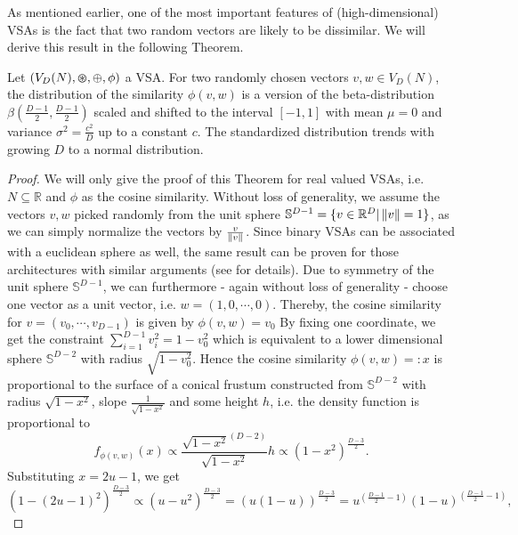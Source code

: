 As mentioned earlier, one of the most important features of (high-dimensional) \acp{VSA} is the fact that two random vectors are likely to be dissimilar.
We will derive this result in the following Theorem.
\begin{theorem}
	\label{theorem:VSA_cossim_distribution}
	Let $\left(V_{D}(N), \varoast, \oplus, \phi \right)$ a \acl{VSA}.
	For two randomly chosen vectors $v, w \in V_{D}(N)$, the distribution of the similarity $\phi\left(v,w\right)$ is a version of the beta-distribution $\beta\left(\frac{D-1}{2},\frac{D-1}{2}\right)$ scaled and shifted to the interval $\left[-1,1\right]$ with mean $\mu=0$ and variance $\sigma^2=\frac{c^2}{D}$ up to a constant $c$. The standardized distribution trends with growing $D$ to a normal distribution.
\end{theorem}
\begin{proof}
	We will only give the proof of this Theorem for real valued \acp{VSA}, i.e. $N \subseteq \mathbb{R}$ and $\phi$ as the cosine similarity.
	Without loss of generality, we assume the vectors $v,w$ picked randomly from the unit sphere $\mathbb{S}^{D-1} = \{ v \in \mathbb{R}^{D} | \left\| v \right\| = 1 \}$, as we can simply normalize the vectors by $\frac{v}{\left\| v \right\|}$.
	Since binary \acp{VSA} can be associated with a euclidean sphere as well, the same result can be proven for those architectures with similar arguments (see \cite{Kanerva1988} for details).
	Due to symmetry of the unit sphere $\mathbb{S}^{D-1}$, we can furthermore - again without loss of generality - choose one vector as a unit vector, i.e. $w=\left(1, 0 , \cdots, 0\right)$.
	Thereby, the cosine similarity for $v=\left(v_{0}, \cdots, v_{D-1}\right)$ is given by $\phi\left(v,w\right) = v_{0}$
	By fixing one coordinate, we get the constraint $\sum_{i=1}^{D-1} v_{i}^{2} = 1-v_{0}^{2}$ which is equivalent to a lower dimensional sphere $\mathbb{S}^{D-2}$ with radius $\sqrt{1-v_{0}^2}$.
	Hence the cosine similarity $\phi\left(v,w\right)=:x$ is proportional to the surface of a conical frustum constructed from $\mathbb{S}^{D-2}$ with radius $\sqrt{1-x^{2}}$, slope $\frac{1}{\sqrt{1-x^{2}}}$ and some height $h$, i.e. the density function is proportional to
	\[
	f_{\phi(v,w)}(x) \propto \frac{\sqrt{1-x^{2}}^{(D-2)}}{\sqrt{1-x^{2}}} h \propto \left(1-x^{2}\right)^{\frac{D-3}{2}}.
	\]
	Substituting $x=2u-1$, we get
	\[
	\left(1-\left(2u-1\right)^{2}\right)^{\frac{D-3}{2}} \propto \left(u-u^2\right)^{\frac{D-3}{2}} = \left(u \left(1-u\right)\right)^{\frac{D-3}{2}} = u^{\left(\frac{D-1}{2}-1\right)} \left(1-u\right)^{\left(\frac{D-1}{2}-1\right)},
\]
\end{proof}
